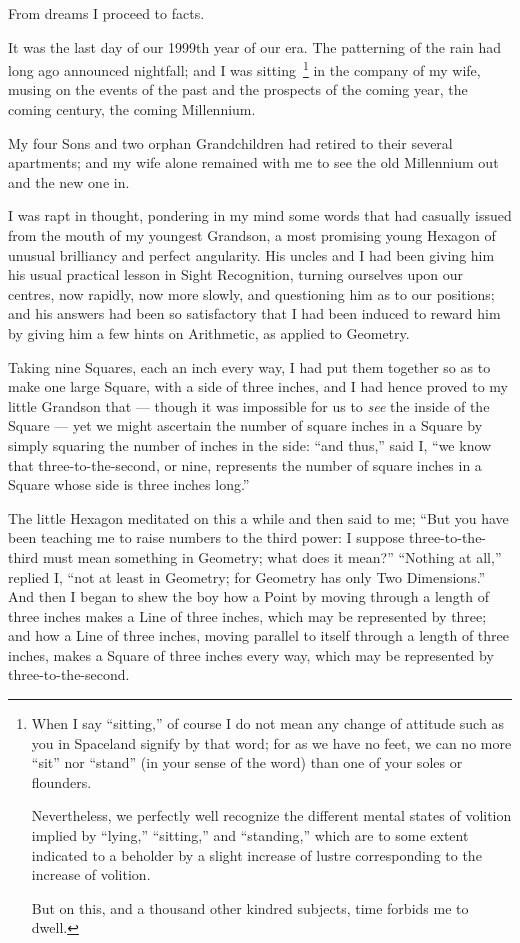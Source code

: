 \documentclass[10pt, kindle, oneside]{kindle}
\begin{document}
From dreams I proceed to facts.

It was the last day of our 1999th year of our era. The patterning of the rain
had long ago announced nightfall; and I was sitting~\footnote{When I say
``sitting,'' of course I do not mean any change of attitude such as you in
Spaceland signify by that word; for as we have no feet, we can no more ``sit''
nor ``stand'' (in your sense of the word) than one of your soles or flounders.

Nevertheless, we perfectly well recognize the different mental states of
volition implied by ``lying,'' ``sitting,'' and ``standing,'' which are to some
extent indicated to a beholder by a slight increase of lustre corresponding to
the increase of volition.

But on this, and a thousand other kindred subjects, time forbids me to dwell.}
in the company of my wife, musing on the events of the past and the prospects
of the coming year, the coming century, the coming Millennium.

My four Sons and two orphan Grandchildren had retired to their several
apartments; and my wife alone remained with me to see the old Millennium out
and the new one in.

I was rapt in thought, pondering in my mind some words that had casually
issued from the mouth of my youngest Grandson, a most promising young Hexagon
of unusual brilliancy and perfect angularity. His uncles and I had been giving
him his usual practical lesson in Sight Recognition, turning ourselves upon
our centres, now rapidly, now more slowly, and questioning him as to our
positions; and his answers had been so satisfactory that I had been induced to
reward him by giving him a few hints on Arithmetic, as applied to Geometry.

Taking nine Squares, each an inch every way, I had put them together so as to
make one large Square, with a side of three inches, and I had hence proved to
my little Grandson that --- though it was impossible for us to \emph{see} the inside of
the Square --- yet we might ascertain the number of square inches in a Square by
simply squaring the number of inches in the side: ``and thus,'' said I, ``we know
that three-to-the-second, or nine, represents the number of square inches in a
Square whose side is three inches long.''

The little Hexagon meditated on this a while and then said to me; ``But you
have been teaching me to raise numbers to the third power: I suppose
three-to-the-third must mean something in Geometry; what does it mean?''
``Nothing at all,'' replied I, ``not at least in Geometry; for Geometry has only
Two Dimensions.'' And then I began to shew the boy how a Point by moving
through a length of three inches makes a Line of three inches, which may be
represented by three; and how a Line of three inches, moving parallel to
itself through a length of three inches, makes a Square of three inches every
way, which may be represented by three-to-the-second.
\end{document}
